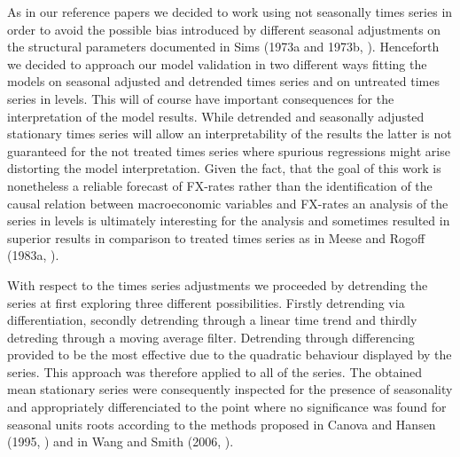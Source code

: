As in our reference papers we decided to work using not seasonally times series in order to avoid
the possible bias introduced by different seasonal 
adjustments on the structural parameters documented in Sims (1973a and 1973b, \cite{Simsa, Simsb}).
Henceforth we decided to approach our model validation in two different ways fitting the models
on seasonal adjusted and detrended times series and on untreated times series in levels.
This will of course have important consequences for the interpretation of the model results.
While detrended and seasonally adjusted stationary times series will allow an interpretability
of the results the latter is not guaranteed for the not treated times series where spurious regressions
might arise distorting the model interpretation. Given the fact, that the goal of this work
is nonetheless a reliable forecast of FX-rates rather than the identification of the causal
relation between macroeconomic variables and FX-rates an analysis of the series in levels is
ultimately interesting for the analysis and sometimes resulted in superior results in comparison to treated times
series as in Meese and Rogoff (1983a, \cite{MeeseRogoffa}).

With respect to the times series adjustments we proceeded by detrending the series at first exploring three
different possibilities. Firstly detrending via differentiation, secondly detrending through a
linear time trend and thirdly detreding through a moving average filter. Detrending through differencing
provided to be the most effective due to the quadratic behaviour displayed by
the series. This approach was therefore applied to all of the series.
The obtained mean stationary series were consequently inspected for the presence of seasonality and appropriately
differenciated to the point where no significance was found for seasonal units roots according to the methods
proposed in Canova and Hansen (1995, \cite{CanovaHansen}) and in Wang and Smith (2006, \cite{WangSmith}).